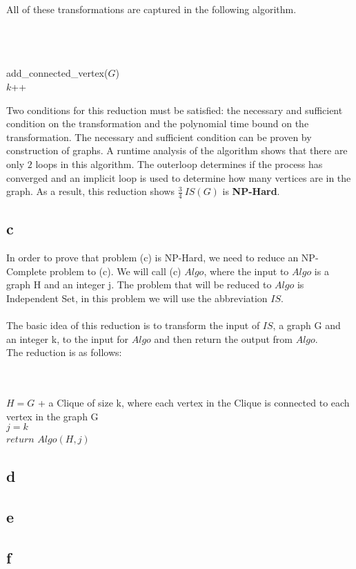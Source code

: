 \documentclass[12pt]{article}
\begin{document}
All of these transformations are captured in the following algorithm.\\\\    
\begin{algorithm}[H]
\\
\\
{
    {
         add\_connected\_vertex($G$)\\
         $k$++
    }
}
\end{algorithm}
Two conditions for this reduction must be satisfied: the necessary and sufficient
condition on the transformation and the polynomial time bound on the transformation.
The necessary and sufficient condition can be proven by construction of graphs.  A
runtime analysis of the algorithm shows that there are only $2$ loops in this 
algorithm.  The outerloop determines if the process has converged and an implicit
loop is used to determine how many vertices are in the graph.  As a result, this
reduction shows $\frac{3}{4}\ IS(G)$ is \textbf{NP-Hard}.
\subsection*{c}
In order to prove that problem (c) is NP-Hard, we need to reduce an NP-Complete problem to (c). We will call (c) {$Algo$}, where the input to {$Algo$} is a graph H and an integer j. The problem that will be reduced to {$Algo$} is Independent Set, in this problem we will use the abbreviation {$IS$}.\\\\
The basic idea of this reduction is to transform the input of {$IS$}, a graph G and an integer k, to the input for {$Algo$} and then return the output from {$Algo$}.\\
The reduction is as follows: \\\\
\begin{algorithm}[H]
\\
{$H =  G$ + a Clique of size k, where each vertex in the Clique is connected to each vertex in the graph G}\\
{$j = k$}\\
{$return$  $Algo(H, j)$}
\end{algorithm}
\subsection*{d}
\subsection*{e}
\subsection*{f}
\end{document}
